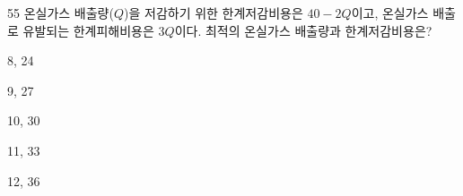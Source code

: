 \begin{question}{55}
온실가스 배출량($Q$)을 저감하기 위한 한계저감비용은 $40-2Q$이고, 온실가스 배출로 유발되는 한계피해비용은 $3Q$이다. 최적의 온실가스 배출량과 한계저감비용은?
\begin{choices}
  \item 8, 24
  \item 9, 27
  \item 10, 30
  \item 11, 33
  \item 12, 36
\end{choices}
\end{question}
